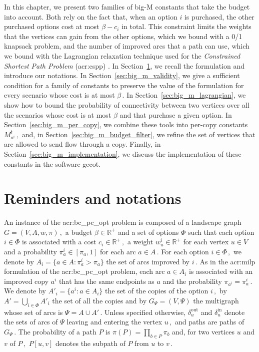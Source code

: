 \documentclass[11pt,a4paper]{report}
\theoremstyle{definition}
\theoremstyle{remark}
\begin{document}
In this chapter, we present two families of big-M constants that take the budget into account. Both rely on the fact that, when an option $i$ is purchased, the other purchased options cost at most $\beta - c_i$ in total. This constraint limits the weights that the vertices can gain from the other options, which we bound with a 0/1 knapsack problem, and the number of improved arcs that a path can use, which we bound with the Lagrangian relaxation technique used for the \textit{Constrained Shortest Path Problem} (\gls{acr:cspp}) \cite{CSP-LANGRAGIAN-RELAXATION_HANDLER_1980,CSP-LAGRANGIAN-RELAXATION_AHUJA_1993}. In Section~\ref{sec:big_m_reminders}, we recall the formulation and introduce our notations. In Section~\ref{sec:big_m_validity}, we give a sufficient condition for a family of constants to preserve the value of the formulation for every scenario whose cost is at most $\beta\,.$ In Section~\ref{sec:big_m_lagrangian}, we show how to bound the probability of connectivity between two vertices over all the scenarios whose cost is at most $\beta$ and that purchase a given option. In Section~\ref{sec:big_m_per_copy}, we combine these tools into per-copy constants $M^t_{a^i}\,,$ and, in Section~\ref{sec:big_m_budget_filter}, we refine the set of vertices that are allowed to send flow through a copy. Finally, in Section~\ref{sec:big_m_implementation}, we discuss the implementation of these constants in the software gecot.


\section{Reminders and notations}\label{sec:big_m_reminders}

An instance of the \gls{acr:bc_pc_opt} problem is composed of a landscape graph $G=(V,A,w,\pi)\,,$ a budget $\beta \in \mathbb{R}^+$ and a set of options $\Phi$ such that each option $i \in \Phi$ is associated with a cost $c_i \in \mathbb{R}^+\,,$ a weight $w^i_u \in \mathbb{R}^+$ for each vertex $u \in V$ and a probability $\pi^i_a \in [\pi_a, 1]$ for each arc $a \in A\,.$ For each option $i \in \Phi\,,$ we denote by $A_i = \{a \in A : \pi^i_a > \pi_a\}$ the set of arcs improved by $i\,.$ As in the \gls{acr:milp} formulation of the \gls{acr:bc_pc_opt} problem, each arc $a \in A_i$ is associated with an improved copy $a^i$ that has the same endpoints as $a$ and the probability $\pi_{a^i} = \pi^i_a\,.$ We denote by $A'_i = \{a^i : a \in A_i\}$ the set of the copies of the option $i\,,$ by $A' = \bigcup_{i \in \Phi} A'_i$ the set of all the copies and by $G_\Psi = (V, \Psi)$ the multigraph whose set of arcs is $\Psi = A \cup A'\,.$ Unless specified otherwise, $\delta^{\text{out}}_u$ and $\delta^{\text{in}}_u$ denote the sets of arcs of $\Psi$ leaving and entering the vertex $u\,,$ and paths are paths of $G_\Psi\,.$ The probability of a path $P$ is $\pi(P) = \prod_{b \in P} \pi_b$ and, for two vertices $u$ and $v$ of $P\,,$ $P[u,v]$ denotes the subpath of $P$ from $u$ to $v\,.$
\end{document}
